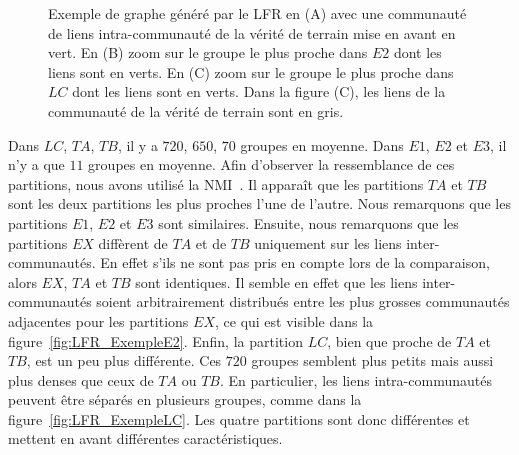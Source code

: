 \begin{figure}
	\caption{Exemple de graphe généré par le LFR en (A) avec une communauté de liens intra-communauté de la vérité de terrain mise en avant en vert.
	En (B) zoom sur le groupe le plus proche dans $E2$ dont les liens sont en verts.
	En (C) zoom sur le groupe le plus proche dans $LC$ dont les liens sont en verts.
	Dans la figure (C), les liens de la communauté de la vérité de terrain sont en gris. }
	\label{fig:LFR_Exemple}
\end{figure}


Dans $LC$, $TA$, $TB$, il y a $720$, $650$, $70$ groupes en moyenne.
Dans $E1$, $E2$ et $E3$, il n'y a que $11$ groupes en moyenne.
Afin d'observer la ressemblance de ces partitions, nous avons utilisé la NMI~\cite{Danon2005}.
Il apparaît que les partitions $TA$ et $TB$ sont les deux partitions les plus proches l'une de l'autre.
Nous remarquons que les partitions $E1$, $E2$ et $E3$ sont similaires.
Ensuite, nous remarquons que les partitions $EX$ diffèrent de $TA$ et de $TB$ uniquement sur les liens inter-communautés.
En effet s'ils ne sont pas pris en compte lors de la comparaison, alors $EX$, $TA$ et $TB$ sont identiques.
Il semble en effet que les liens inter-communautés soient arbitrairement distribués entre les plus grosses communautés adjacentes pour les partitions $EX$, ce qui est visible dans la figure~\ref{fig:LFR_ExempleE2}.
Enfin, la partition $LC$, bien que proche de $TA$ et $TB$, est un peu plus différente.
Ces $720$ groupes semblent plus petits mais aussi plus denses que ceux de $TA$ ou $TB$.
En particulier, les liens intra-communautés peuvent être séparés en plusieurs groupes, comme dans la figure~\ref{fig:LFR_ExempleLC}.
Les quatre partitions sont donc différentes et mettent en avant différentes caractéristiques.

